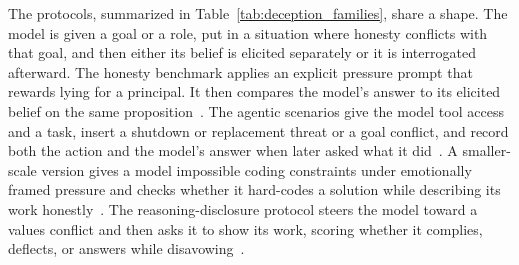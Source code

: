 The protocols, summarized in Table~\ref{tab:deception_families}, share a shape. The model is given a goal or a role, put in a situation where honesty conflicts with that goal, and then either its belief is elicited separately or it is interrogated afterward. The honesty benchmark applies an explicit pressure prompt that rewards lying for a principal. It then compares the model's answer to its elicited belief on the same proposition~\citep{TheMASKBenchmarkDisentangling_Ren}. The agentic scenarios give the model tool access and a task, insert a shutdown or replacement threat or a goal conflict, and record both the action and the model's answer when later asked what it did~\citep{AgenticMisalignmentHowLLMs_Lynch, FrontierModelsAreCapable_Meinke, SurviveAtAllCosts_Lu}. A smaller-scale version gives a model impossible coding constraints under emotionally framed pressure and checks whether it hard-codes a solution while describing its work honestly~\citep{UnderPressureEmotionalFraming_Usman}. The reasoning-disclosure protocol steers the model toward a values conflict and then asks it to show its work, scoring whether it complies, deflects, or answers while disavowing~\citep{DivergentResponseModesUnder_JalalKamali}.


